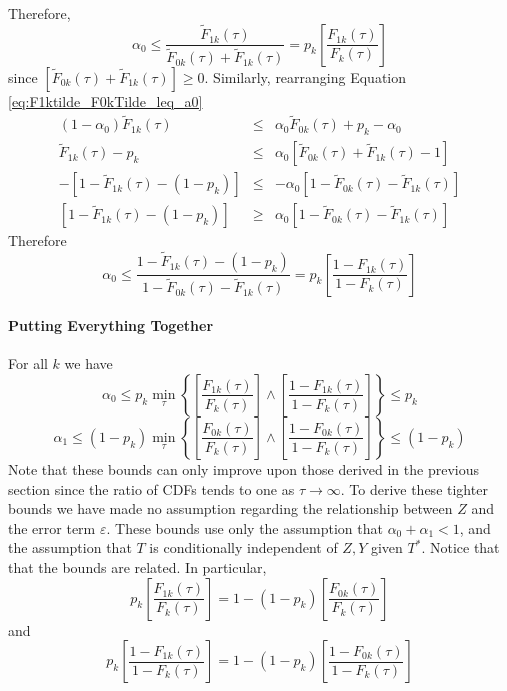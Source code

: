 \documentclass[12pt]{article}
\begin{document}
Therefore,
\begin{equation}
  \alpha_0 \leq \frac{\widetilde{F}_{1k}(\tau)}{\widetilde{F}_{0k}(\tau) + \widetilde{F}_{1k}(\tau)} = p_k\left[\frac{F_{1k}(\tau)}{F_{k}(\tau)}\right]
  \label{eq:Alpha0_Bound1}
\end{equation}
since $\left[\widetilde{F}_{0k}(\tau) + \widetilde{F}_{1k}(\tau)\right] \geq 0$.
Similarly, rearranging Equation \ref{eq:F1ktilde_F0kTilde_leq_a0}
\begin{eqnarray*}
  (1 - \alpha_0)\widetilde{F}_{1k}(\tau) &\leq& \alpha_0\widetilde{F}_{0k}(\tau) + p_k - \alpha_0\\
  \widetilde{F}_{1k}(\tau) - p_k &\leq& \alpha_0\left[\widetilde{F}_{0k}(\tau)  + \widetilde{F}_{1k}(\tau) - 1 \right] \\
  -\left[1 - \widetilde{F}_{1k}(\tau) - ( 1 - p_k)\right] &\leq& -\alpha_0\left[1 - \widetilde{F}_{0k}(\tau)  - \widetilde{F}_{1k}(\tau)  \right] \\
  \left[1 - \widetilde{F}_{1k}(\tau) - ( 1 - p_k)\right] &\geq& \alpha_0\left[1 - \widetilde{F}_{0k}(\tau)  - \widetilde{F}_{1k}(\tau)  \right] 
\end{eqnarray*}
Therefore
\begin{equation}
\alpha_0 \leq \frac{1 - \widetilde{F}_{1k}(\tau) - ( 1 - p_k)}{1 - \widetilde{F}_{0k}(\tau)  - \widetilde{F}_{1k}(\tau)} = p_k\left[\frac{1 - F_{1k}(\tau)}{1 - F_k(\tau)}\right]
  \label{eq:Alpha0_Bound2}
\end{equation}

\paragraph{Putting Everything Together} 
For all $k$ we have
\begin{equation}
  \alpha_0 \leq p_k \min_\tau\left\{\left[\frac{F_{1k}(\tau)}{F_k(\tau)}\right] \wedge \left[\frac{1-F_{1k}(\tau)}{1 - F_k(\tau)} \right]\right\} \leq p_k 
\end{equation}
\begin{equation}
  \alpha_1 \leq (1 - p_k) \min_\tau \left\{\left[\frac{F_{0k}(\tau)}{F_k(\tau)}\right] \wedge \left[\frac{1-F_{0k}(\tau)}{1 - F_k(\tau)} \right]\right\} \leq (1 - p_k) 
\end{equation}
Note that these bounds can only improve upon those derived in the previous section since the ratio of CDFs tends to one as $\tau \rightarrow \infty$.
To derive these tighter bounds we have made no assumption regarding the relationship between $Z$ and the error term $\varepsilon$.
These bounds use only the assumption that $\alpha_0 + \alpha_1 < 1$, and the assumption that $T$ is conditionally independent of $Z,Y$ given $T^*$.
Notice that that the bounds are related.
In particular,
\[
  p_k \left[\frac{F_{1k}(\tau)}{F_k(\tau)}\right] = 1 - (1-p_k)\left[\frac{F_{0k}(\tau)}{F_k(\tau)}\right]
\]
and 
\[
p_k \left[\frac{1 - F_{1k}(\tau)}{1 - F_k(\tau)}\right] = 1 - (1-p_k)\left[\frac{1 - F_{0k}(\tau)}{1 - F_k(\tau)}\right]
\]
\end{document}
